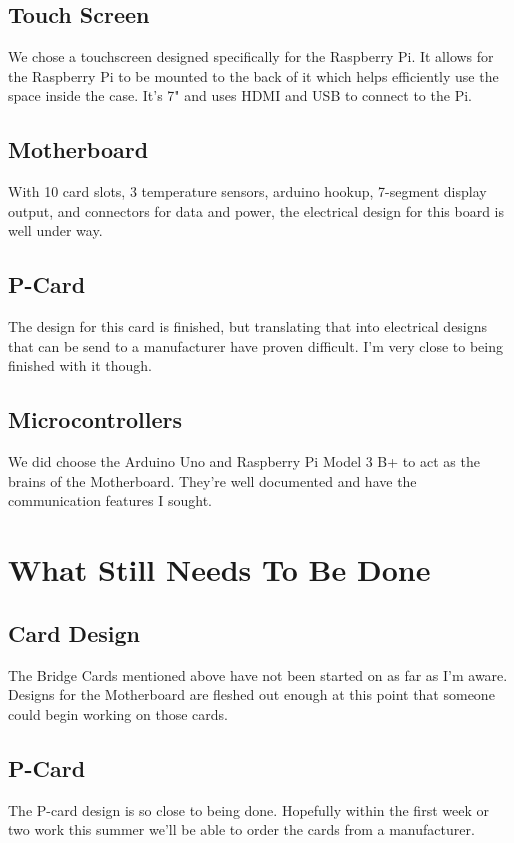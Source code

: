 \documentclass[prb,preprint]{revtex4-1}
\begin{document}
\subsection{Touch Screen}
We chose a touchscreen designed specifically for the Raspberry Pi. It allows for the Raspberry Pi to be mounted to the back of it which helps efficiently use the space inside the case. It's 7" and uses HDMI and USB to connect to the Pi.

\subsection{Motherboard}
With 10 card slots, 3 temperature sensors, arduino hookup, 7-segment display output, and connectors for data and power, the electrical design for this board is well under way.

\subsection{P-Card}
The design for this card is finished, but translating that into electrical designs that can be send to a manufacturer have proven difficult. I'm very close to being finished with it though.

\subsection{Microcontrollers}
We did choose the Arduino Uno and Raspberry Pi Model 3 B+ to act as the brains of the Motherboard. They're well documented and have the communication features I sought.

\section{What Still Needs To Be Done}
\subsection{Card Design}
The Bridge Cards mentioned above have not been started on as far as I'm aware. Designs for the Motherboard are fleshed out enough at this point that someone could begin working on those cards. 

\subsection{P-Card}
The P-card design is so close to being done. Hopefully within the first week or two work this summer we'll be able to order the cards from a manufacturer.
\end{document}
